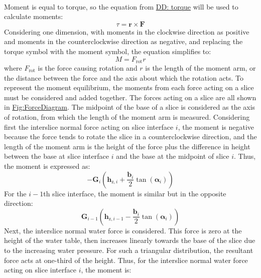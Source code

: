 \documentclass[12pt]{article}
\begin{document}
\paragraph{}
\label{GD:momentEqlDeriv}
Moment is equal to torque, so the equation from \hyperref[DD:torque]{DD: torque} will be used to calculate moments:
\begin{displaymath}
τ=\mathbf{r}\times\mathbf{F}
\end{displaymath}
Considering one dimension, with moments in the clockwise direction as positive and moments in the counterclockwise direction as negative, and replacing the torque symbol with the moment symbol, the equation simplifies to:
\begin{displaymath}
M={F_{\text{rot}}} r
\end{displaymath}
where ${F_{\text{rot}}}$ is the force causing rotation and $r$ is the length of the moment arm, or the distance between the force and the axis about which the rotation acts. To represent the moment equilibrium, the moments from each force acting on a slice must be considered and added together. The forces acting on a slice are all shown in \hyperref[Figure:ForceDiagram]{Fig:ForceDiagram}. The midpoint of the base of a slice is considered as the axis of rotation, from which the length of the moment arm is measured. Considering first the interslice normal force acting on slice interface $i$, the moment is negative because the force tends to rotate the slice in a counterclockwise direction, and the length of the moment arm is the height of the force plus the difference in height between the base at slice interface $i$ and the base at the midpoint of slice $i$. Thus, the moment is expressed as:
\begin{displaymath}
-{\mathbf{G}}_{i} \left({\mathbf{h}_{\text{z},i}}+\frac{{\mathbf{b}}_{i}}{2} \tan\left({\mathbf{α}}_{i}\right)\right)
\end{displaymath}
For the $i-1$th slice interface, the moment is similar but in the opposite direction:
\begin{displaymath}
{\mathbf{G}}_{i-1} \left({\mathbf{h}_{\text{z},i-1}}-\frac{{\mathbf{b}}_{i}}{2} \tan\left({\mathbf{α}}_{i}\right)\right)
\end{displaymath}
Next, the interslice normal water force is considered. This force is zero at the height of the water table, then increases linearly towards the base of the slice due to the increasing water pressure. For such a triangular distribution, the resultant force acts at one-third of the height. Thus, for the interslice normal water force acting on slice interface $i$, the moment is:
\end{document}
